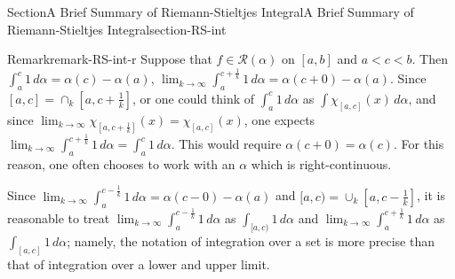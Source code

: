 \documentclass[oneside,10pt,]{article}
\numberwithin{equation}{section}
\newcommand{\cR}{\mathcal{R}}
\begin{document}
\begin{sectionptx}{Section}{A Brief Summary of Riemann-Stieltjes Integral}{}{A Brief Summary of Riemann-Stieltjes Integral}{}{}{section-RS-int}
\begin{remark}{Remark}{}{remark-RS-int-r}
Suppose that \(f\in \cR(\alpha)\) on \([a, b]\) and \(a < c < b\). Then \(\int_{a}^{c}1\, d \alpha=\alpha(c)-\alpha(a)\), \(\lim_{k\to\infty} \int_{a}^{c+ \frac 1k}1\, d \alpha=\alpha(c+0)-\alpha(a)\). Since \([a, c]=\cap_{k}[a, c+ \frac 1k]\), or one could think of \(\int_{a}^{c}1\, d \alpha\) as \(\int \chi_{[a, c]} (x)\, d\alpha\), and since \(\lim_{k\to\infty} \chi_{[a, c+\frac 1k]} (x)=\chi_{[a, c]} (x)\), one expects \(\lim_{k\to\infty} \int_{a}^{c+ \frac 1k}1\, d \alpha= \int_{a}^{c}1\, d \alpha\). This would require \(\alpha(c+0)=\alpha(c)\). For this reason, one often chooses to work with an \(\alpha\) which is right-continuous.%
\par
Since \(\lim_{k\to\infty} \int_{a}^{c- \frac 1k}1\, d \alpha=\alpha(c-0)-\alpha(a)\) and \([a, c)=\cup_{k}[a, c- \frac 1k]\), it is reasonable to treat \(\lim_{k\to\infty} \int_{a}^{c- \frac 1k}1\, d \alpha\) as \(\int_{[a, c)} 1\, d\alpha\) and \(\lim_{k\to\infty} \int_{a}^{c+ \frac 1k}1\, d \alpha\) as \(\int_{[a, c]} 1\, d\alpha\); namely, the notation of integration over a set is more precise than that of integration over a lower and upper limit.%
\end{remark}
\end{sectionptx}
%
%
\typeout{************************************************}
\typeout{************************************************}
%
\end{document}
